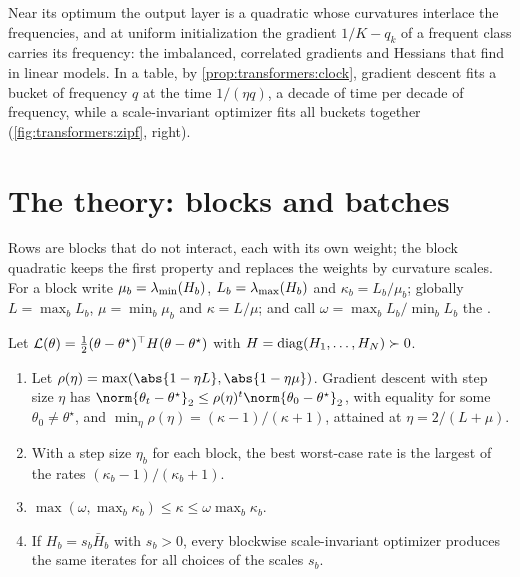 \begin{refsection}
Near its optimum the output layer is a quadratic whose curvatures interlace the frequencies, and at uniform initialization the gradient $1/K-q_k$ of a frequent class carries its frequency: the imbalanced, correlated gradients and Hessians that \textcite{KunstnerEtAl2024} find in linear models. In a table, by \cref{prop:transformers:clock}, gradient descent fits a bucket of frequency $q$ at the time $1/(\eta q)$, a decade of time per decade of frequency, while a scale-invariant optimizer fits all buckets together (\cref{fig:transformers:zipf}, right).

\section{The theory: blocks and batches}\label{sec:transformers:blocks}

Rows are blocks that do not interact, each with its own weight; the block quadratic keeps the first property and replaces the weights by curvature scales. For a block write $\mu_b=\lambda_{\min}(H_b)$, $L_b=\lambda_{\max}(H_b)$ and $\kappa_b=L_b/\mu_b$; globally $L=\max_bL_b$, $\mu=\min_b\mu_b$ and $\kappa=L/\mu$; and call $\omega=\max_bL_b/\min_bL_b$ the .

\begin{theorem}\label{thm:transformers:blocks}
Let $\mathcal{L}(\theta)=\frac12(\theta-\theta^\star)^\top H(\theta-\theta^\star)$ with $H=\operatorname{diag}(H_1,\dots,H_N)\succ0$.
\begin{enumerate}
\item Let $\rho(\eta)=\max(\abs{1-\eta L},\abs{1-\eta\mu})$. Gradient descent with step size $\eta$ has $\norm{\theta_t-\theta^\star}_2\le\rho(\eta)^t\norm{\theta_0-\theta^\star}_2$, with equality for some $\theta_0\ne\theta^\star$, and $\min_\eta\rho(\eta)=(\kappa-1)/(\kappa+1)$, attained at $\eta=2/(L+\mu)$.
\item With a step size $\eta_b$ for each block, the best worst-case rate is the largest of the rates $(\kappa_b-1)/(\kappa_b+1)$.
\item $\max(\omega,\max_b\kappa_b)\le\kappa\le\omega\max_b\kappa_b$.
\item If $H_b=s_b\bar H_b$ with $s_b>0$, every blockwise scale-invariant optimizer produces the same iterates for all choices of the scales $s_b$.
\end{enumerate}
\end{theorem}


\end{refsection}
